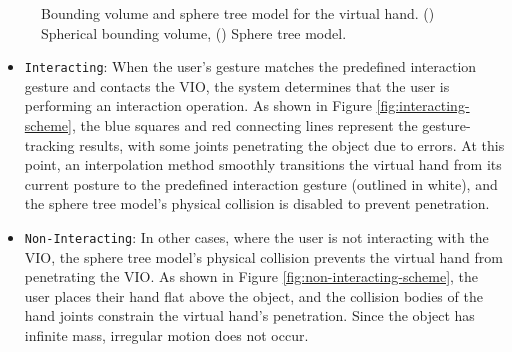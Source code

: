 \documentclass[sigconf,review,anonymous]{acmart}
\begin{document}
\begin{figure}[h]
\begin{subfigure}{0.48\linewidth}
    \caption{} %
    \label{fig:sphere-tree-model}
  \end{subfigure}
  \caption{Bounding volume and sphere tree model for the virtual hand. () Spherical bounding volume, () Sphere tree model.}
  \label{fig:bounding-volume-and-sphere-tree-model}
\end{figure}

\begin{itemize}
  \item {\texttt{Interacting}}: When the user's gesture matches the predefined interaction gesture and contacts the VIO, the system determines that the user is performing an interaction operation. As shown in Figure \ref{fig:interacting-scheme}, the blue squares and red connecting lines represent the gesture-tracking results, with some joints penetrating the object due to errors. At this point, an interpolation method smoothly transitions the virtual hand from its current posture to the predefined interaction gesture (outlined in white), and the sphere tree model's physical collision is disabled to prevent penetration.

  \item {\texttt{Non-Interacting}}: In other cases, where the user is not interacting with the VIO, the sphere tree model's physical collision prevents the virtual hand from penetrating the VIO. As shown in Figure \ref{fig:non-interacting-scheme}, the user places their hand flat above the object, and the collision bodies of the hand joints constrain the virtual hand's penetration. Since the object has infinite mass, irregular motion does not occur.
\end{itemize}
\end{document}
